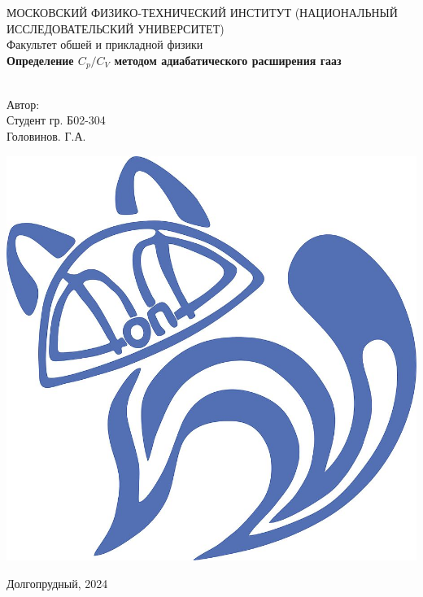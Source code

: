 \begin{titlepage}
	\begin{center}
		МОСКОВСКИЙ ФИЗИКО-ТЕХНИЧЕСКИЙ ИНСТИТУТ (НАЦИОНАЛЬНЫЙ ИССЛЕДОВАТЕЛЬСКИЙ УНИВЕРСИТЕТ) \\
		
		
		\hfill \break
		Факультет обшей и прикладной физики\\
		\vspace{2.5cm}
		\large{\textbf{Определение $C_p/C_V$ методом адиабатического расширения гааз}}\\
		\hfill \break
		\\
	\end{center}
	
	\begin{flushright}
		Автор:\\
		Студент гр. Б02-304\\
		Головинов. Г.А.
	\end{flushright}
	
	\vspace{7cm}
	
	\begin{center}
		\includegraphics[width=0.15\linewidth]{uni}
	\end{center}
	
	
	
	
	\vfill
	
	\begin{center} Долгопрудный, 2024 \end{center}
	
	\thispagestyle{empty}
	
\end{titlepage}
